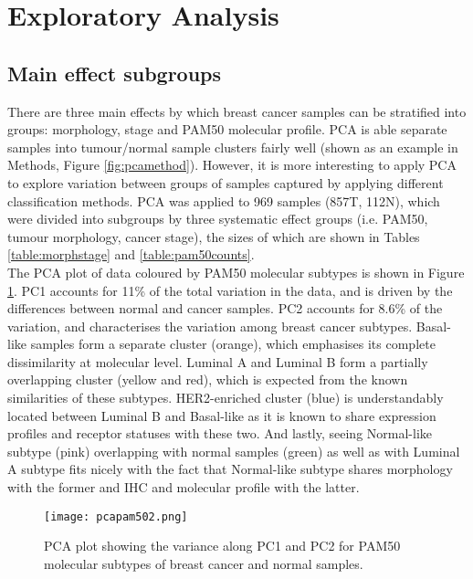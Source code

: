     
\section{Exploratory Analysis}


    \subsection{Main effect subgroups}

    There are three main effects by which breast cancer samples can be stratified into groups: morphology, stage and PAM50 molecular profile. PCA is able separate samples into tumour/normal sample clusters fairly well (shown as an example in Methods, Figure \ref{fig:pcamethod}). However, it is more interesting to apply PCA to explore variation between groups of samples captured by applying different classification methods.  
    PCA was applied to 969 samples (857T, 112N), which were divided into subgroups by three systematic effect groups (i.e. PAM50, tumour morphology, cancer stage), the sizes of which are shown in Tables \ref{table:morphstage} and \ref{table:pam50counts}. \\
    The PCA plot of data coloured by PAM50 molecular subtypes is shown in Figure \ref{fig:pcapam50}. PC1 accounts for 11\% of the total variation in the data, and is driven by the differences between normal and cancer samples. PC2 accounts for 8.6\% of the variation, and characterises the variation among breast cancer subtypes. Basal-like samples form a separate cluster (orange), which emphasises its complete dissimilarity at molecular level. Luminal A and Luminal B form a partially overlapping cluster (yellow and red), which is expected from the known similarities of these subtypes. HER2-enriched cluster (blue) is understandably located between Luminal B and Basal-like as it is known to share expression profiles and receptor statuses with these two. And lastly, seeing Normal-like subtype (pink) overlapping with normal samples (green) as well as with Luminal A subtype fits nicely with the fact that Normal-like subtype shares morphology with the former and IHC and molecular profile with the latter.    
    
            \begin{figure}[!h]
            \centering
            \texttt{[image: pcapam502.png]} 
            \caption[PCA plot showing separation by PAM50 subtypes(2D)]{PCA plot showing the variance along PC1 and PC2 for PAM50 molecular subtypes of breast cancer and normal samples.}
            \label{fig:pcapam50}
            \end{figure}
            
